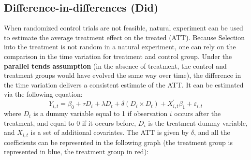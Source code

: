 \documentclass[english]{article}
\begin{document}
\subsection{Difference-in-differences (Did)}
When randomized control trials are not feasible, natural experiment can be used to estimate the average treatment effect on the treated (ATT). Because Selection into the treatment is not random in a natural experiment, one can rely on the comparison in the time variation for treatment and control group. Under the \textbf{parallel tends assumption} (in the absence of treatment, the control and treatment groups would have evolved the same way over time), the difference in the time variation delivers a consistent estimate of the ATT. It can be estimated via the following equation:
\[
Y_{i,t} = \beta_0 + \tau D_i + \lambda D_t + \delta \left(D_i\times D_t  \right) + X_{i,t}^{\prime}\beta_1 + \varepsilon_{i,t}
\]
where $D_t$ is a dummy variable equal to 1 if observation $i$ occurs after the treatment, and equal to 0 if it occurs before, $D_i$ is the treatment dummy variable, and $X_{i,t}$ is a set of additional covariates. The ATT is given by $\delta$, and all the coefficients can be represented in the following graph (the treatment group is represented in {\color{darckcyan}blue}, the treatment group in {\color{DarkRed}red}): 
\end{document}
